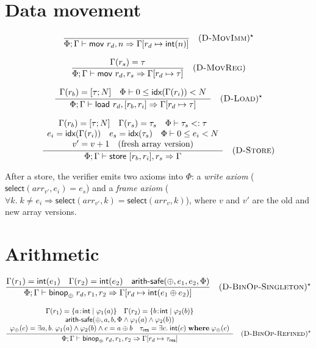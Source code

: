\section*{Data movement}

$$
  \frac{}{\Phi; \Gamma \vdash \textsf{mov } r_d, n \Rightarrow \Gamma[r_d \mapsto \textsf{int}(n)]} \quad (\textsc{D-MovImm})^\star
$$

$$
  \frac{\Gamma(r_s) = \tau}{\Phi; \Gamma \vdash \textsf{mov } r_d, r_s \Rightarrow \Gamma[r_d \mapsto \tau]} \quad (\textsc{D-MovReg})
$$

$$
  \frac{
    \begin{array}{c}
      \Gamma(r_b) = [\tau; N] \quad \Phi \vdash 0 \le \textsf{idx}(\Gamma(r_i)) < N
    \end{array}
  }{\Phi; \Gamma \vdash \textsf{load } r_d, [r_b, r_i] \Rightarrow \Gamma[r_d \mapsto \tau]} \quad (\textsc{D-Load})^\star
$$

$$
  \frac{
    \begin{array}{c}
      \Gamma(r_b) = [\tau; N] \quad \Gamma(r_s) = \tau_s \quad \Phi \vdash \tau_s <: \tau \\
      e_i = \textsf{idx}(\Gamma(r_i)) \quad e_s = \textsf{idx}(\tau_s) \quad \Phi \vdash 0 \le e_i < N \\
      v' = v + 1 \quad \text{(fresh array version)}
    \end{array}
  }{\Phi; \Gamma \vdash \textsf{store } [r_b, r_i], r_s \Rightarrow \Gamma} \quad (\textsc{D-Store})
$$

\noindent After a store, the verifier emits two axioms into $\Phi$: a \textit{write axiom} ($\textsf{select}(\mathit{arr}_{v'}, e_i) = e_s$) and a \textit{frame axiom} ($\forall k.\; k \ne e_i \Rightarrow \textsf{select}(\mathit{arr}_{v'}, k) = \textsf{select}(\mathit{arr}_v, k)$), where $v$ and $v'$ are the old and new array versions.

\section*{Arithmetic}

$$
  \frac{
    \Gamma(r_1) = \textsf{int}(e_1) \quad \Gamma(r_2) = \textsf{int}(e_2) \quad \textsf{arith-safe}(\oplus,e_1,e_2,\Phi)
  }{\Phi; \Gamma \vdash \textsf{binop}_\oplus\; r_d, r_1, r_2 \Rightarrow \Gamma[r_d \mapsto \textsf{int}(e_1 \oplus e_2)]} \quad (\textsc{D-BinOp-Singleton})^\star
$$

$$
  \frac{
    \begin{array}{c}
      \Gamma(r_1) = \{a\!:\!\textsf{int} \mid \varphi_1(a)\} \quad \Gamma(r_2) = \{b\!:\!\textsf{int} \mid \varphi_2(b)\} \\
      \textsf{arith-safe}(\oplus,a,b,\Phi \wedge \varphi_1(a) \wedge \varphi_2(b)) \\
      \varphi_\oplus(c) = \exists a,b.\; \varphi_1(a) \wedge \varphi_2(b) \wedge c = a \oplus b \quad
      \tau_\textsf{res} = \exists c.\; \textsf{int}(c) \;\mathbf{where}\; \varphi_\oplus(c)
    \end{array}
  }{\Phi; \Gamma \vdash \textsf{binop}_\oplus\; r_d, r_1, r_2 \Rightarrow \Gamma[r_d \mapsto \tau_\textsf{res}]} \quad (\textsc{D-BinOp-Refined})^\star
$$


